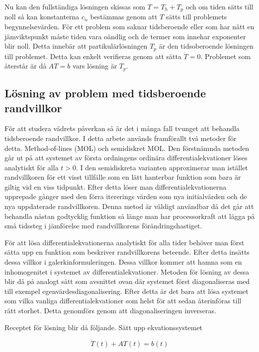\noindent
Nu kan den fullständiga lösningen skissas som $T = T_h + T_p$ och om
tiden sätts till noll så kan konstanterna $c_n$ bestämmas genom
att $T$ sätts till problemets begynnelsevärden. För ett problem som
saknar tidsberoende eller som har nått en jämviktspunkt måste
tiden vara oändlig och de termer som innehar exponenter blir noll.
Detta innebär att partikulärlösningen $T_p$ är den tidsoberoende lösningen
till problemet. Detta kan enkelt verifieras genom att sätta $\dot{T} = 0$.
Problemet som återstår är då $AT = b$ vars lösning är $T_p$.

\subsection{Lösning av problem med tidsberoende randvillkor}

För att studera vädrets påverkan så är det i många fall tvunget att behandla
tidsberoende randvillkor. I detta arbete används framförallt två metoder för detta.
Method-of-lines (MOL) och semidiskret MOL. Den förstnämnda metoden går ut på att
systemet av första ordningens ordinära differentialekvationer löses analytiskt för
alla $t>0$. I den semidiskreta varianten approximerar man istället randvillkoren för
ett visst tillfälle som en lätt hanterbar funktion som bara är giltig vid
en viss tidpunkt. Efter detta löser man differentialekvationerna upprepade gånger
med den förra itererings värden som nya initialvärden och de nya uppdaterade
randvillkoren. Denna metod är väldigt användbar då det går att behandla nästan godtycklig
funktion så länge man har processorkraft att lägga på små tidssteg i jämförelse med
randvillkorens förändringshastiget.

För att lösa differentialekvationerna analytiskt för alla tider behöver man först
sätta upp en funktion som beskriver randvillkorens beteende. Efter detta insätts
dessa villkor i galerkinformuleringen. Dessa villkor kommer att hamna som en inhomogenitet
i systemet av differentialekvationer. Metoden för lösning av dessa blir då på analogt sätt
som avsnittet ovan där systemet först diagonaliseras med till exempel egenvärdesdiagonalisering. Efter
detta är det bara att lösa systemet som vilka vanliga differentialekvationer som helst för att sedan
återinföras till rätt storhet. Detta genomförs genom att diagonaliseringen inverseras.

Receptet för lösning blir då följande. Sätt upp ekvationssystemet

\begin{equation}
\label{eq:femheat:ourdiff}
\dot{T}(t) + AT(t) = b(t)
\end{equation}

